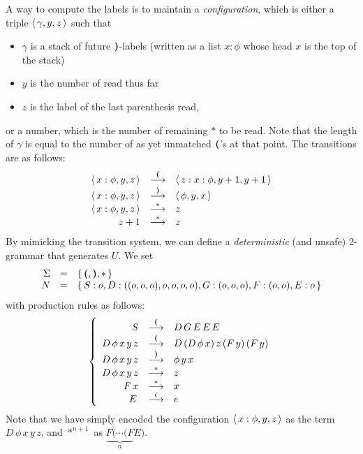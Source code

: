 A way to compute the labels is to maintain a \emph{configuration},
which is either a triple $\langle\,{\gamma, y, z}\,\rangle$ such that
\begin{itemize}
\item $\gamma$ is a stack of future ${\sf \textbf{)}}$-{labels} (written as a list
$x : \phi$ whose head $x$ is the top of the stack)

\item $y$ is the number of \hbox{\pq} read thus far

\item $z$ is the label of the last parenthesis read,
\end{itemize}
or a number, which is the number of remaining $\ast$ to be read. Note
that the length of $\gamma$ is equal to the number of as yet unmatched
${\sf \textbf{(}}$'s at that point. The transitions are as follows:
\[\begin{array}{rll}
\langle\,{x:\phi, y, z}\,\rangle & \stackrel{{{\sf \textbf{(}}}}{\longrightarrow} & \langle\,{z: x : \phi, y+1, y+1}\,\rangle\\
\langle\,{x:\phi, y, z}\,\rangle & \stackrel{{{\sf \textbf{)}}}}{\longrightarrow} & \langle\,{\phi, y, x}\,\rangle\\
\langle\,{x:\phi, y, z}\,\rangle & \stackrel{{\ast}}{\longrightarrow} & z\\
z+1 & \stackrel{{\ast}}{\longrightarrow} & z\\
\end{array}\]
By mimicking the transition system, we can define a
\emph{deterministic} (and unsafe) 2-grammar that generates $U$. We set
\[\begin{array}{rll}
\Sigma & = & \{\,{{\sf \textbf{(}} , {\sf \textbf{)}} , \ast }\,\}\\
N & = & \{\,{S: o, D : ((o, o, o), o, o, o, o), G : (o, o, o),
F : (o, o), E : o}\,\}
\end{array}\]
with production rules as follows:
\[\left\{\begin{array}{rll}
S & \stackrel{{{\sf \textbf{(}}}}{\longrightarrow} & D \, G \, E \, E \, E \\
D \, \phi \, x \, y \, z & \stackrel{{{\sf \textbf{(}}}}{\longrightarrow} & D \, (D \, \phi \, x) \, z \, (F \, y) \, (F \,  y)\\
D \, \phi \, x \, y \, z & \stackrel{{{\sf \textbf{)}}}}{\longrightarrow} & \phi \, y \, x \\
D \, \phi \, x \, y \, z & \stackrel{{\ast}}{\longrightarrow} & z \\
F \, x & \stackrel{{\ast}}{\longrightarrow} & x \\
E \, & \stackrel{{\epsilon}}{\longrightarrow} & e
\end{array}\right.\]
Note that we have simply encoded the configuration $\langle\,{x :
\phi, y, z}\,\rangle$ as the term $D \, \phi \, x \, y \, z$, and
$\ast^{n+1}$ as $\underbrace{F( \cdots (F}_{n} E)$.

